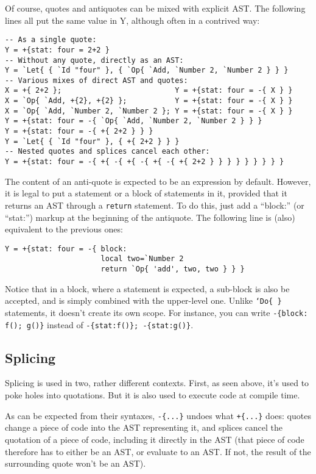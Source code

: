 Of course, quotes and antiquotes can be mixed with explicit AST. The
following lines all put the same value in Y, although often in a
contrived way:

\begin{Verbatim}[fontsize=\scriptsize]
-- As a single quote:
Y = +{stat: four = 2+2 }
-- Without any quote, directly as an AST:
Y = `Let{ { `Id "four" }, { `Op{ `Add, `Number 2, `Number 2 } } }
-- Various mixes of direct AST and quotes:
X = +{ 2+2 };                          Y = +{stat: four = -{ X } }
X = `Op{ `Add, +{2}, +{2} };           Y = +{stat: four = -{ X } }
X = `Op{ `Add, `Number 2, `Number 2 }; Y = +{stat: four = -{ X } }
Y = +{stat: four = -{ `Op{ `Add, `Number 2, `Number 2 } } }
Y = +{stat: four = -{ +{ 2+2 } } }
Y = `Let{ { `Id "four" }, { +{ 2+2 } } }
-- Nested quotes and splices cancel each other:
Y = +{stat: four = -{ +{ -{ +{ -{ +{ -{ +{ 2+2 } } } } } } } } }
\end{Verbatim}

The content of an anti-quote is expected to be an expression by
default. However, it is legal to put a statement or a block of
statements in it, provided that it returns an AST through a
\verb+return+ statement. To do this, just add a ``block:''
(or ``stat:'') markup at the beginning of the antiquote. The
following line is (also) equivalent to the previous ones:

\begin{verbatim}
Y = +{stat: four = -{ block: 
                      local two=`Number 2
                      return `Op{ 'add', two, two } } }
\end{verbatim}

Notice that in a block, where a statement is expected, a sub-block is
also be accepted, and is simply combined with the upper-level
one. Unlike {\tt`Do\{ \}} statements, it doesn't create its own scope.
For instance, you can write \verb|-{block: f(); g()}| instead of
\verb|-{stat:f()}; -{stat:g()}|.

\subsection{Splicing}
Splicing is used in two, rather different contexts. First, as seen
above, it's used to poke holes into quotations. But it is also used to
execute code at compile time.

As can be expected from their syntaxes, \verb|-{...}| undoes what
\verb|+{...}| does: quotes change a piece of code into the AST
representing it, and splices cancel the quotation of a piece of code,
including it directly in the AST (that piece of code therefore has to
either be an AST, or evaluate to an AST. If not, the result of the
surrounding quote won't be an AST).

